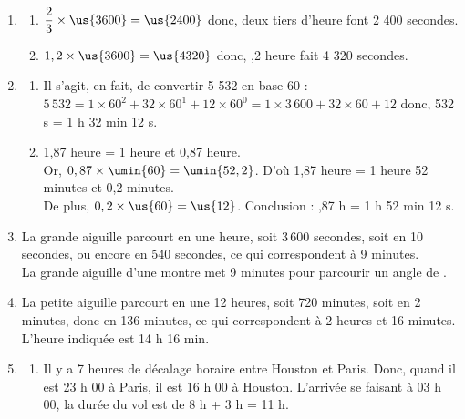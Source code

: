 \begin{corrige} 
\ \\ [-5mm]
   \begin{enumerate}
      \item 
         \begin{enumerate}
            \item $\dfrac23\times\us{3600} =\us{2400}$ donc, {\blue deux tiers d'heure font 2 400 secondes.} \smallskip
            \item $1,2\times\us{3600} =\us{4320}$ donc, {,2 heure fait 4 320 secondes.}
         \end{enumerate}
      \setcounter{enumi}{1}
      \item 
         \begin{enumerate}
            \item Il s'agit, en fait, de convertir 5 532 en base 60 : \\
               $5\,532 =1\times60^2+32\times60^1+12\times60^0 =1\times3\,600+32\times60+12$
               donc, { 532 s = 1 h 32 min 12 s.}
            \item 1,87 heure = 1 heure et 0,87 heure. \\
               Or, $0,87\times\umin{60} =\umin{52,2}$. D'où 1,87 heure = 1 heure 52 minutes et 0,2 minutes. \\
               De plus, $0,2\times\us{60} =\us{12}$. Conclusion : {,87 h = 1 h 52 min 12 s}.
         \end{enumerate}
       \setcounter{enumi}{2}
       \item La grande aiguille parcourt   en une heure, soit 3\,600 secondes, soit   en 10 secondes, ou encore   en 540 secondes, ce qui correspondent à 9 minutes. \\ 
         {\blue La grande aiguille d'une montre met 9 minutes pour parcourir un angle de  }.
      \item La petite aiguille parcourt   en une 12 heures, soit 720 minutes, soit  en 2 minutes, donc   en 136 minutes, ce qui correspondent à 2 heures et 16 minutes. \\
         {\blue L'heure indiquée est 14 h 16 min}.
      \item
         \begin{enumerate}
            \item Il y a 7 heures de décalage horaire entre Houston et Paris. Donc, quand il est 23 h 00 à Paris, il est 16 h 00 à Houston. L'arrivée se faisant à 03 h 00, la durée du vol est de 8 h + 3 h = 11 h. \\

\end{enumerate}
\end{enumerate}
\end{corrige}
